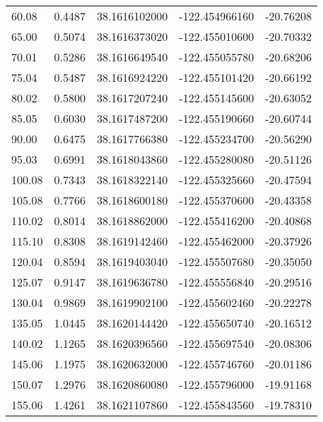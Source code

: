 \begin{longtable}{p{2.5cm}p{2.5cm}p{3cm}p{3cm}p{2.5cm}}
        60.08  &	     0.4487 &               38.1616102000  &   -122.454966160   &	-20.76208 \\
        65.00  &	     0.5074 &               38.1616373020  &   -122.455010600   &	-20.70332 \\
        70.01  &	     0.5286 &               38.1616649540  &   -122.455055780   &	-20.68206 \\
        75.04  &	     0.5487 &               38.1616924220  &   -122.455101420   &	-20.66192 \\
        80.02  &	     0.5800 &               38.1617207240  &   -122.455145600   &	-20.63052 \\
        85.05  &	     0.6030 &               38.1617487200  &   -122.455190660   &	-20.60744 \\
        90.00  &	     0.6475 &               38.1617766380  &   -122.455234700   &	-20.56290 \\
        95.03  &	     0.6991 &               38.1618043860  &   -122.455280080   &	-20.51126 \\
       100.08  & 	 0.7343 &               38.1618322140  &   -122.455325660   &	-20.47594 \\
       105.08  & 	 0.7766 &               38.1618600180  &   -122.455370600   &	-20.43358 \\
       110.02  & 	 0.8014 &               38.1618862000  &   -122.455416200   &	-20.40868 \\
       115.10  & 	 0.8308 &               38.1619142460  &   -122.455462000   &	-20.37926 \\
       120.04  & 	 0.8594 &               38.1619403040  &   -122.455507680   &	-20.35050 \\
       125.07  & 	 0.9147 &               38.1619636780  &   -122.455556840   &	-20.29516 \\
       130.04  & 	 0.9869 &               38.1619902100  &   -122.455602460   &	-20.22278 \\
       135.05  & 	 1.0445 &               38.1620144420  &   -122.455650740   &	-20.16512 \\
       140.02  & 	 1.1265 &               38.1620396560  &   -122.455697540   &	-20.08306 \\
       145.06  & 	 1.1975 &               38.1620632000  &   -122.455746760   &	-20.01186 \\
       150.07  & 	 1.2976 &               38.1620860080  &   -122.455796000   &	-19.91168 \\
       155.06  & 	 1.4261 &               38.1621107860  &   -122.455843560   &	-19.78310 \\

\end{longtable}
